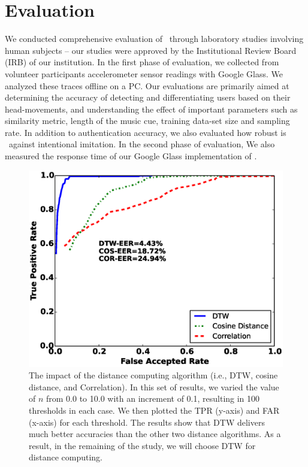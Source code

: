\section{Evaluation}\label{sec:results}

We conducted comprehensive evaluation of \systemname~through laboratory studies involving
human subjects -- our studies were approved by the Institutional Review Board (IRB) of our
institution. In the first phase of evaluation, we collected from volunteer participants accelerometer sensor
readings with Google Glass. We analyzed these traces offline on a PC.
Our evaluations are primarily aimed at determining the accuracy of detecting
and differentiating users based on their head-movements, and understanding
the effect of important parameters such as similarity metric, length of the music cue, training
data-set size and sampling rate. In addition to authentication accuracy, we also evaluated how robust is \systemname~against intentional imitation.
In the second phase of evaluation, We also measured the response time of our Google
Glass implementation of \systemname.


\begin{figure}\centering
\includegraphics[width=.75\columnwidth]{figure/roc_dtw_cos_cor.eps}
\caption{\label{fig:roc_dtw_cos_cor} The impact of the distance computing algorithm (i.e., DTW, cosine distance, and Correlation). In this set of results, we varied the value of $n$ from 0.0 to 10.0 with an increment of 0.1, resulting in 100 thresholds in each case. We then plotted the TPR (y-axis) and FAR (x-axis) for each threshold. The results show that DTW delivers much better accuracies than the other two distance algorithms. As a result, in the remaining of the study, we will choose DTW for distance computing.}
\end{figure}

